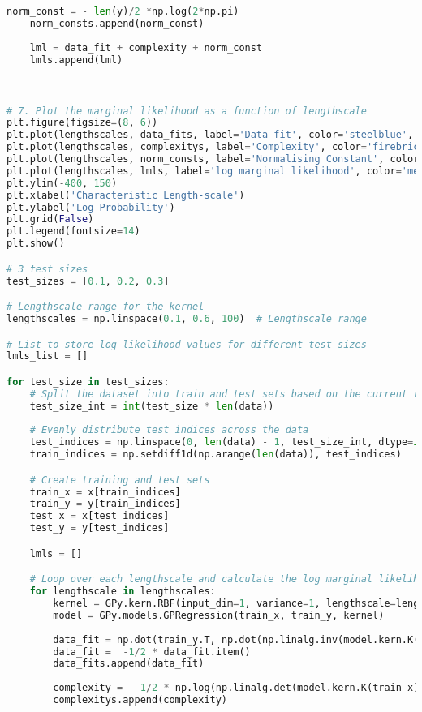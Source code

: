 \documentclass[12pt,a4paper]{article}
\begin{document}
\begin{lstlisting}[language=python, caption={Code of the Creation of Figure \ref{fig:logml analysis plots}}]
    norm_const = - len(y)/2 *np.log(2*np.pi) 
    norm_consts.append(norm_const)
   
    lml = data_fit + complexity + norm_const
    lmls.append(lml)
    


# 7. Plot the marginal likelihood as a function of lengthscale
plt.figure(figsize=(8, 6))
plt.plot(lengthscales, data_fits, label='Data fit', color='steelblue', linewidth=3)
plt.plot(lengthscales, complexitys, label='Complexity', color='firebrick', linewidth=3)
plt.plot(lengthscales, norm_consts, label='Normalising Constant', color='darkorange', linewidth=3)
plt.plot(lengthscales, lmls, label='log marginal likelihood', color='mediumpurple', linewidth=3)
plt.ylim(-400, 150)
plt.xlabel('Characteristic Length-scale')
plt.ylabel('Log Probability')
plt.grid(False)
plt.legend(fontsize=14)
plt.show()

# 3 test sizes
test_sizes = [0.1, 0.2, 0.3]

# Lengthscale range for the kernel
lengthscales = np.linspace(0.1, 0.6, 100)  # Lengthscale range

# List to store log likelihood values for different test sizes
lmls_list = []

for test_size in test_sizes:
    # Split the dataset into train and test sets based on the current test_size
    test_size_int = int(test_size * len(data))
    
    # Evenly distribute test indices across the data
    test_indices = np.linspace(0, len(data) - 1, test_size_int, dtype=int)
    train_indices = np.setdiff1d(np.arange(len(data)), test_indices)

    # Create training and test sets
    train_x = x[train_indices]
    train_y = y[train_indices]
    test_x = x[test_indices]
    test_y = y[test_indices]

    lmls = []

    # Loop over each lengthscale and calculate the log marginal likelihood
    for lengthscale in lengthscales:
        kernel = GPy.kern.RBF(input_dim=1, variance=1, lengthscale=lengthscale)
        model = GPy.models.GPRegression(train_x, train_y, kernel)
        
        data_fit = np.dot(train_y.T, np.dot(np.linalg.inv(model.kern.K(train_x)), train_y))
        data_fit =  -1/2 * data_fit.item()
        data_fits.append(data_fit)
        
        complexity = - 1/2 * np.log(np.linalg.det(model.kern.K(train_x)))
        complexitys.append(complexity)
        

\end{lstlisting}
\end{document}

